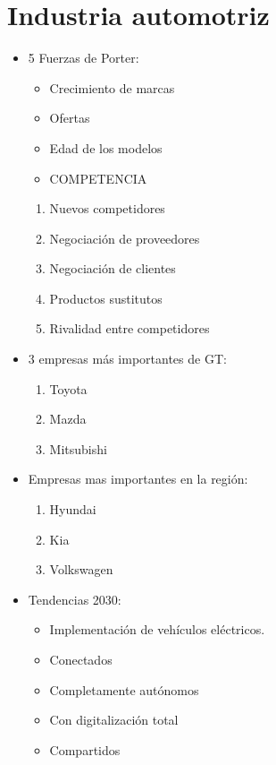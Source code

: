 \section{Industria automotriz}
\begin{itemize}
    \item 5 Fuerzas de Porter:
        \begin{itemize}
            \item Crecimiento de marcas 
            \item Ofertas 
            \item Edad de los modelos 
            \item COMPETENCIA 
        \end{itemize}
        \begin{enumerate}
            \item Nuevos competidores 
            \item Negociación de proveedores 
            \item Negociación de clientes 
            \item Productos sustitutos 
            \item Rivalidad entre competidores
        \end{enumerate}
    
    \item 3 empresas más importantes de GT: 
        \begin{enumerate}
            \item Toyota 
            \item Mazda 
            \item Mitsubishi
        \end{enumerate}
    
    \item Empresas mas importantes en la región: 
        \begin{enumerate}
            \item Hyundai 
            \item Kia 
            \item Volkswagen
        \end{enumerate}
    
    \item Tendencias 2030: 
        \begin{itemize}
            \item Implementación de vehículos eléctricos. 
            \item Conectados 
            \item Completamente autónomos 
            \item Con digitalización total 
            \item Compartidos
        \end{itemize}
    

\end{itemize}
